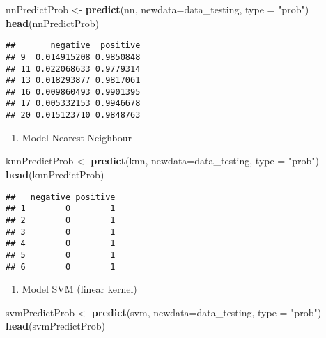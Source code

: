 \documentclass[]{article}
\newenvironment{Shaded}{\begin{snugshade}}{\end{snugshade}}
\newcommand{\DataTypeTok}[1]{\textcolor[rgb]{0.13,0.29,0.53}{#1}}
\newcommand{\KeywordTok}[1]{\textcolor[rgb]{0.13,0.29,0.53}{\textbf{#1}}}
\newcommand{\NormalTok}[1]{#1}
\newcommand{\StringTok}[1]{\textcolor[rgb]{0.31,0.60,0.02}{#1}}
\providecommand{\tightlist}{%
  \setlength{\itemsep}{0pt}\setlength{\parskip}{0pt}}
\begin{document}
\begin{Shaded}
\begin{Highlighting}[]
\NormalTok{nnPredictProb <-}\StringTok{ }\KeywordTok{predict}\NormalTok{(nn, }\DataTypeTok{newdata=}\NormalTok{data_testing, }\DataTypeTok{type =} \StringTok{"prob"}\NormalTok{)}
\KeywordTok{head}\NormalTok{(nnPredictProb)}
\end{Highlighting}
\end{Shaded}

\begin{verbatim}
##       negative  positive
## 9  0.014915208 0.9850848
## 11 0.022068633 0.9779314
## 13 0.018293877 0.9817061
## 16 0.009860493 0.9901395
## 17 0.005332153 0.9946678
## 20 0.015123710 0.9848763
\end{verbatim}

\begin{enumerate}
\def\labelenumi{\arabic{enumi}.}
\setcounter{enumi}{3}
\tightlist
\item
  Model Nearest Neighbour
\end{enumerate}

\begin{Shaded}
\begin{Highlighting}[]
\NormalTok{knnPredictProb <-}\StringTok{ }\KeywordTok{predict}\NormalTok{(knn, }\DataTypeTok{newdata=}\NormalTok{data_testing, }\DataTypeTok{type =} \StringTok{"prob"}\NormalTok{)}
\KeywordTok{head}\NormalTok{(knnPredictProb)}
\end{Highlighting}
\end{Shaded}

\begin{verbatim}
##   negative positive
## 1        0        1
## 2        0        1
## 3        0        1
## 4        0        1
## 5        0        1
## 6        0        1
\end{verbatim}

\begin{enumerate}
\def\labelenumi{\arabic{enumi}.}
\setcounter{enumi}{4}
\tightlist
\item
  Model SVM (linear kernel)
\end{enumerate}

\begin{Shaded}
\begin{Highlighting}[]
\NormalTok{svmPredictProb <-}\StringTok{ }\KeywordTok{predict}\NormalTok{(svm, }\DataTypeTok{newdata=}\NormalTok{data_testing, }\DataTypeTok{type =} \StringTok{"prob"}\NormalTok{)}
\KeywordTok{head}\NormalTok{(svmPredictProb)}
\end{Highlighting}
\end{Shaded}
\end{document}
